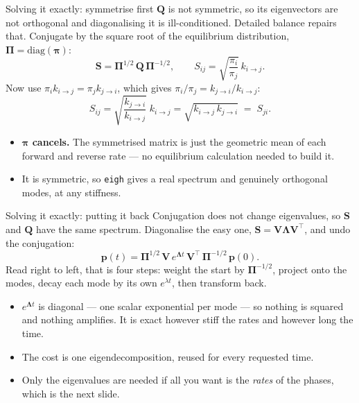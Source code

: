 \documentclass[10pt,aspectratio=169]{beamer}
\newcommand{\Q}{\bm{Q}}
\newcommand{\pib}{\bm{\pi}}
\newcommand{\code}[1]{\texttt{\small #1}}
\begin{document}
\begin{frame}{Solving it exactly: symmetrise first}
  $\Q$ is not symmetric, so its eigenvectors are not orthogonal and
  diagonalising it is ill-conditioned. Detailed balance repairs that.
  Conjugate by the square root of the equilibrium distribution,
  $\bm{\Pi}=\mathrm{diag}(\pib)$:
  \[
    \bm{S} = \bm{\Pi}^{1/2}\,\Q\,\bm{\Pi}^{-1/2},
    \qquad
    S_{ij} = \sqrt{\frac{\pi_i}{\pi_j}}\,k_{i\to j} .
  \]
  Now use $\pi_i k_{i\to j} = \pi_j k_{j\to i}$, which gives
  $\pi_i/\pi_j = k_{j\to i}/k_{i\to j}$:
  \[
    S_{ij} = \sqrt{\frac{k_{j\to i}}{k_{i\to j}}}\;k_{i\to j}
      = \sqrt{k_{i\to j}\,k_{j\to i}} \;=\; S_{ji}.
  \]
  \begin{itemize}
    \item \textbf{$\pib$ cancels.} The symmetrised matrix is just the
      geometric mean of each forward and reverse rate --- no equilibrium
      calculation needed to build it.
    \item It is symmetric, so \code{eigh} gives a real spectrum and genuinely
      orthogonal modes, at any stiffness.
  \end{itemize}
\end{frame}

\begin{frame}{Solving it exactly: putting it back}
  Conjugation does not change eigenvalues, so $\bm{S}$ and $\Q$ have the
  same spectrum. Diagonalise the easy one, $\bm{S}=\bm{V}\bm{\Lambda}
  \bm{V}^{\!\top}$, and undo the conjugation:
  \[
    \bm{p}(t) = \bm{\Pi}^{1/2}\,\bm{V}\,e^{\bm{\Lambda}t}\,
      \bm{V}^{\!\top}\,\bm{\Pi}^{-1/2}\,\bm{p}(0) .
  \]
  Read right to left, that is four steps: weight the start by
  $\bm{\Pi}^{-1/2}$, project onto the modes, decay each mode by its own
  $e^{\lambda t}$, then transform back.
  \begin{itemize}
    \item $e^{\bm{\Lambda}t}$ is diagonal --- one scalar exponential per
      mode --- so nothing is squared and nothing amplifies. It is exact
      however stiff the rates and however long the time.
    \item The cost is one eigendecomposition, reused for every requested
      time.
    \item Only the eigenvalues are needed if all you want is the
      \emph{rates} of the phases, which is the next slide.
  \end{itemize}
\end{frame}
\end{document}
